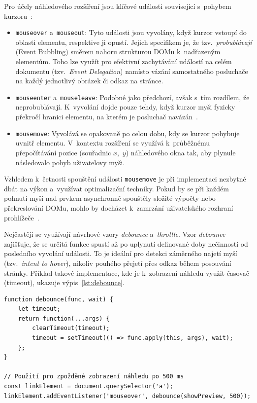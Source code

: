\documentclass[a4paper,12pt]{article}
\begin{document}
Pro účely náhledového rozšíření jsou klíčové události související s~pohybem kurzoru~\autocite{mdn_mouse}:
\begin{itemize}
    \item \texttt{mouseover} a~\texttt{mouseout}: Tyto události jsou vyvolány, když kurzor vstoupí do oblasti elementu, respektive ji opustí. Jejich specifikem je, že tzv.~\textit{probublávají} (Event Bubbling) směrem nahoru strukturou DOMu k~nadřazeným elementům. Toho lze využít pro efektivní zachytávání událostí na celém dokumentu (tzv.~\textit{Event Delegation}) namísto vázání samostatného posluchače na každý jednotlivý obrázek či odkaz na stránce.
    \item \texttt{mouseenter} a~\texttt{mouseleave}: Podobné jako předchozí, avšak s~tím rozdílem, že neprobublávají. K~vyvolání dojde pouze tehdy, když kurzor myši fyzicky překročí hranici elementu, na kterém je posluchač navázán~\autocite{mdn_mouse}.
    \item \texttt{mousemove}: Vyvolává se opakovaně po celou dobu, kdy se kurzor pohybuje uvnitř elementu. V~kontextu rozšíření se využívá k~průběžnému přepočítávání pozice (souřadnic $x$,~$y$) náhledového okna tak, aby plynule následovalo pohyb uživatelovy myši.
\end{itemize}

Vzhledem k~četnosti spouštění události \texttt{mousemove} je při implementaci nezbytné dbát na výkon a~využívat optimalizační techniky. Pokud by se při každém pohnutí myši nad prvkem asynchronně spouštěly složité výpočty nebo překreslování DOMu, mohlo by docházet k~zamrzání uživatelského rozhraní prohlížeče~\autocite{flanagan2020}. 

Nejčastěji se využívají návrhové vzory \textit{debounce} a~\textit{throttle}. Vzor \textit{debounce} zajišťuje, že se určitá funkce spustí až po uplynutí definované doby nečinnosti od posledního vyvolání události. To je ideální pro detekci záměrného najetí myší (tzv.~\textit{intent to hover}), nikoliv pouhého přejetí přes odkaz během posouvání stránky. Příklad takové implementace, kde je k~zobrazení náhledu využit časovač (timeout), ukazuje výpis~\ref{lst:debounce}.

\begin{lstlisting}[caption={Příklad jednoduché implementace funkce debounce pro odložení náhledu}, label={lst:debounce}]
function debounce(func, wait) {
    let timeout;
    return function(...args) {
        clearTimeout(timeout);
        timeout = setTimeout(() => func.apply(this, args), wait);
    };
}

// Použití pro zpožděné zobrazení náhledu po 500 ms
const linkElement = document.querySelector('a');
linkElement.addEventListener('mouseover', debounce(showPreview, 500));
\end{lstlisting}
\end{document}
